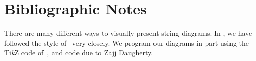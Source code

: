 


\section*{Bibliographic Notes}

There are many different ways to visually present string diagrams. In
, we have
followed the style of~\cite{broadbent-karvonen-2022} very closely. We program
our diagrams in part using the Ti\textit{k}Z code
of~\cite{broadbent-karvonen-2022}, and code due to Zajj Daugherty.
